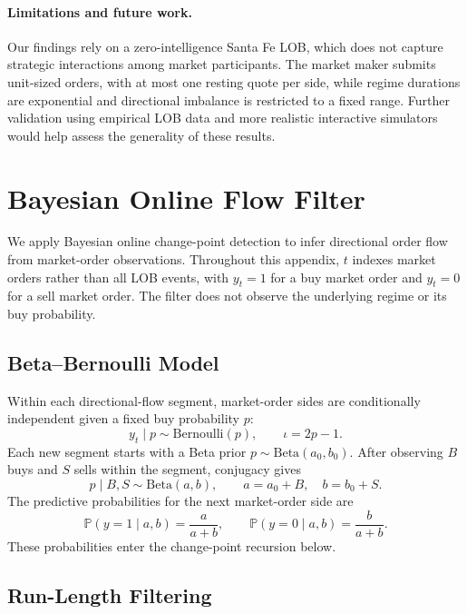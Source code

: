 \documentclass[11pt,a4paper]{article}
\newcommand{\Prob}{\mathbb{P}}
\begin{document}
\paragraph{Limitations and future work.}
Our findings rely on a zero-intelligence Santa Fe LOB,
which does not capture strategic interactions among market
participants. The market maker submits unit-sized orders,
with at most one resting quote per side, while regime
durations are exponential and directional imbalance is
restricted to a fixed range. Further validation using
empirical LOB data and more realistic interactive
simulators would help assess the generality of these
results.

{\small


}

\appendix

\section{Bayesian Online Flow Filter}
\label{app:bayesian_flow_filter}

We apply Bayesian online change-point detection
\citep{adams2007bocpd,fearnhead2007online} to infer
directional order flow from market-order observations.
Throughout this appendix, $t$ indexes market orders
rather than all LOB events, with $y_t=1$ for a buy
market order and $y_t=0$ for a sell market order.
The filter does not observe the underlying regime
or its buy probability.

\subsection{Beta--Bernoulli Model}

Within each directional-flow segment, market-order
sides are conditionally independent given a fixed
buy probability $p$:
\[
  y_t\mid p\sim\mathrm{Bernoulli}(p),
  \qquad \iota=2p-1.
\]
Each new segment starts with a Beta prior
$p\sim\mathrm{Beta}(a_0,b_0)$.
After observing $B$ buys and $S$ sells within
the segment, conjugacy gives
\[
  p\mid B,S\sim\mathrm{Beta}(a,b),
  \qquad
  a=a_0+B,\quad b=b_0+S.
\]
The predictive probabilities for the next
market-order side are
\[
  \Prob(y=1\mid a,b)=\frac{a}{a+b},
  \qquad
  \Prob(y=0\mid a,b)=\frac{b}{a+b}.
\]
These probabilities enter the change-point
recursion below.

\subsection{Run-Length Filtering}
\end{document}

